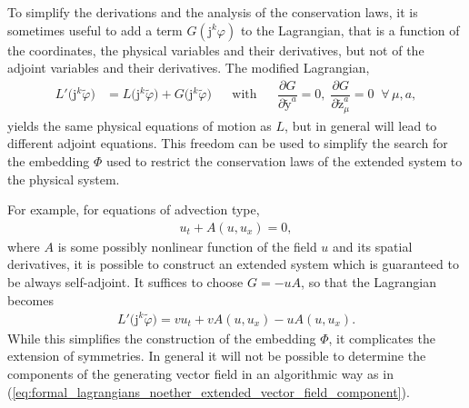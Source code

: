 \documentclass[12pt,a4paper,reqno]{article}
\begin{document}
To simplify the derivations and the analysis of the conservation laws, it is sometimes useful to add a term $G ({\ensuremath{\mathrm{j}}}^{k} {\ensuremath{\varphi}})$ to the Lagrangian, that is a function of the coordinates, the physical variables and their derivatives, but not of the adjoint variables and their derivatives.
The modified Lagrangian,
\begin{align}\label{eq:formal_lagrangians_generalisation}
L' \big( {\ensuremath{\mathrm{j}}}^{k} \tilde{\ensuremath{\varphi}} \big) &= L \big( {\ensuremath{\mathrm{j}}}^{k} \tilde{\ensuremath{\varphi}} \big) + G \big( {\ensuremath{\mathrm{j}}}^{k} \tilde{\ensuremath{\varphi}} \big) &
& \text{with} & &
\dfrac{\partial G}{\partial \tilde{\ensuremath{{\ensuremath{\mathrm{{y}}}}}}^{a}} = 0 , \;
\dfrac{\partial G}{\partial \tilde{\ensuremath{{\ensuremath{\mathrm{{z}}}}}}_{\mu}^{a}} = 0 \; \; \forall \, \mu, a ,
\end{align}
yields the same physical equations of motion as $L$, but in general will lead to different adjoint equations.
This freedom can be used to simplify the search for the embedding $\Phi$ used to restrict the conservation laws of the extended system to the physical system.

For example, for equations of advection type,
\begin{align}
{\ensuremath{{\ensuremath{{u}}}}}_{\ensuremath{{\ensuremath{{t}}}}} + A({\ensuremath{{\ensuremath{{u}}}}}, {\ensuremath{{\ensuremath{{u}}}}}_{\ensuremath{{\ensuremath{{x}}}}}) = 0 ,
\end{align}
where $A$ is some possibly nonlinear function of the field ${\ensuremath{{\ensuremath{{u}}}}}$ and its spatial derivatives,
it is possible to construct an extended system which is guaranteed to be always self-adjoint.
It suffices to choose $G=-uA$, so that the Lagrangian becomes
\begin{align}
L' \big( {\ensuremath{\mathrm{j}}}^{k} \tilde{\ensuremath{\varphi}} \big) = {\ensuremath{{\ensuremath{{v}}}}} {\ensuremath{{\ensuremath{{u}}}}}_{\ensuremath{{\ensuremath{{t}}}}} + {\ensuremath{{\ensuremath{{v}}}}} A({\ensuremath{{\ensuremath{{u}}}}}, {\ensuremath{{\ensuremath{{u}}}}}_{\ensuremath{{\ensuremath{{x}}}}}) - {\ensuremath{{\ensuremath{{u}}}}} A({\ensuremath{{\ensuremath{{u}}}}}, {\ensuremath{{\ensuremath{{u}}}}}_{\ensuremath{{\ensuremath{{x}}}}}) .
\end{align}
While this simplifies the construction of the embedding $\Phi$, it complicates the extension of symmetries. In general it will not be possible to determine the components of the generating vector field in an algorithmic way as in (\ref{eq:formal_lagrangians_noether_extended_vector_field_component}).
\end{document}
